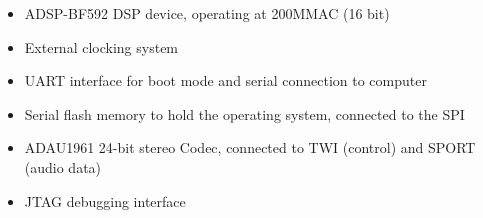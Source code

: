 \begin{itemize}
	\setlength\itemsep{0.1em}
	\item ADSP-BF592 DSP device, operating at 200MMAC (16 bit)
	\item External clocking system 
	\item UART interface for boot mode and serial connection to computer 
	\item Serial flash memory to hold the operating system, connected to the SPI 
	\item ADAU1961 24-bit stereo Codec, connected to TWI (control) and SPORT (audio data)
	\item JTAG debugging interface
\end{itemize}
